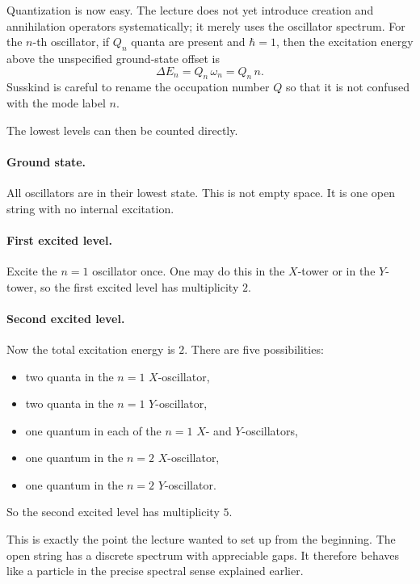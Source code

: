 Quantization is now easy. The lecture does not yet introduce creation and annihilation operators systematically; it merely uses the oscillator spectrum. For the \(n\)-th oscillator, if \(Q_n\) quanta are present and \(\hbar=1\), then the excitation energy above the unspecified ground-state offset is
\begin{equation}
\Delta E_n = Q_n\,\omega_n = Q_n\,n.
\end{equation}
Susskind is careful to rename the occupation number \(Q\) so that it is not confused with the mode label \(n\).

The lowest levels can then be counted directly.

\paragraph{Ground state.}
All oscillators are in their lowest state. This is not empty space. It is one open string with no internal excitation.

\paragraph{First excited level.}
Excite the \(n=1\) oscillator once. One may do this in the \(X\)-tower or in the \(Y\)-tower, so the first excited level has multiplicity \(2\).

\paragraph{Second excited level.}
Now the total excitation energy is \(2\). There are five possibilities:
\begin{itemize}
\item two quanta in the \(n=1\) \(X\)-oscillator,
\item two quanta in the \(n=1\) \(Y\)-oscillator,
\item one quantum in each of the \(n=1\) \(X\)- and \(Y\)-oscillators,
\item one quantum in the \(n=2\) \(X\)-oscillator,
\item one quantum in the \(n=2\) \(Y\)-oscillator.
\end{itemize}
So the second excited level has multiplicity \(5\).

This is exactly the point the lecture wanted to set up from the beginning. The open string has a discrete spectrum with appreciable gaps. It therefore behaves like a particle in the precise spectral sense explained earlier.


